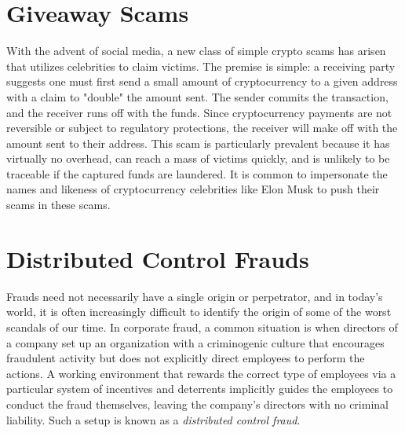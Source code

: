\section{Giveaway Scams}

With the advent of social media, a new class of simple crypto scams has arisen
that utilizes celebrities to claim victims. The premise is simple: a receiving
party suggests one must first send a small amount of cryptocurrency to a given
address with a claim to "double" the amount sent. The sender commits the
transaction, and the receiver runs off with the funds. Since cryptocurrency
payments are not reversible or subject to regulatory protections, the receiver
will make off with the amount sent to their address. This scam is particularly
prevalent because it has virtually no overhead, can reach a mass of victims
quickly, and is unlikely to be traceable if the captured funds are laundered. It
is common to impersonate the names and likeness of cryptocurrency celebrities
like Elon Musk to push their scams in these scams.


\section{Distributed Control Frauds}

Frauds need not necessarily have a single origin or perpetrator, and in today's
world, it is often increasingly difficult to identify the origin of some of the
worst scandals of our time. In corporate fraud, a common situation is when
directors of a company set up an organization with a criminogenic culture that
encourages fraudulent activity but does not explicitly direct employees to
perform the actions. A working environment that rewards the correct type of
employees via a particular system of incentives and deterrents implicitly guides
the employees to conduct the fraud themselves, leaving the company's directors
with no criminal liability. Such a setup is known as a \textit{distributed control
fraud}. \cite{davies_lying_2018}

